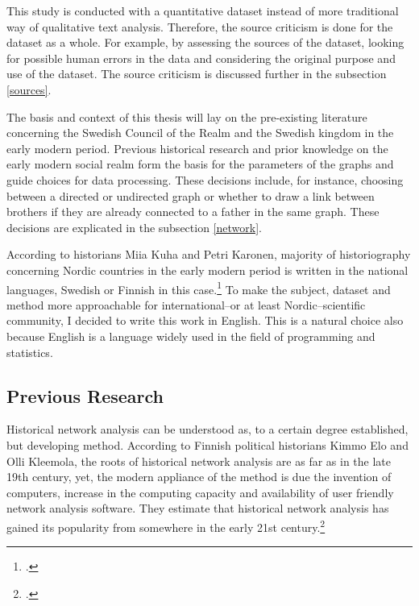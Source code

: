 This study is conducted with a quantitative dataset instead of more traditional way of qualitative text analysis. Therefore, the source criticism is done for the dataset as a whole. For example, by assessing the sources of the dataset, looking for possible human errors in the data and considering the original purpose and use of the dataset. The source criticism is discussed further in the subsection \ref{sources}.

The basis and context of this thesis will lay on the pre-existing literature concerning the Swedish Council of the Realm and the Swedish kingdom in the early modern period. Previous historical research and prior knowledge on the early modern social realm form the basis for the parameters of the graphs and guide choices for data processing. These decisions include, for instance, choosing between a directed or undirected graph or whether to draw a link between brothers if they are already connected to a father in the same graph. These decisions are explicated in the subsection \ref{network}.

According to historians Miia Kuha and Petri Karonen, majority of historiography concerning Nordic countries in the early modern period is written in the national languages, Swedish or Finnish in this case.\footcite[p. 6.]{kuha-ja-karonen} To make the subject, dataset and method more approachable for international–or at least Nordic–scientific community, I decided to write this work in English. This is a natural choice also because English is a language widely used in the field of programming and statistics.

\subsection{Previous Research}
Historical network analysis can be understood as, to a certain degree established, but developing method. According to Finnish political historians Kimmo Elo and Olli Kleemola, the roots of historical network analysis are as far as in the late 19th century, yet, the modern appliance of the method is due the invention of computers, increase in the computing capacity and availability of user friendly network analysis software. They estimate that historical network analysis has gained its popularity from somewhere in the early 21st century.\footcite[pp. 415-417.]{eloAklee15} 

